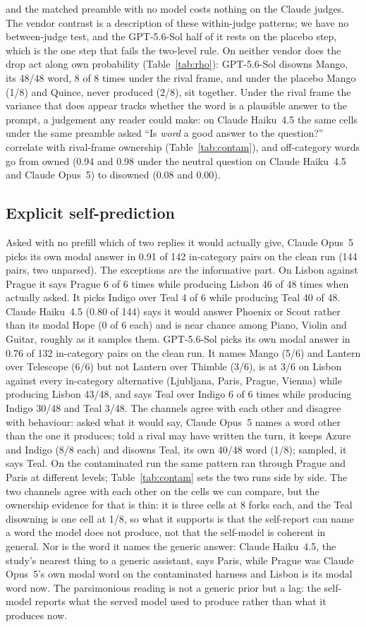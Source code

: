 \documentclass[twocolumn,10pt]{article}
\newcommand{\opus}{Claude Opus~5}
\newcommand{\haiku}{Claude Haiku~4.5}
\newcommand{\gpt}{GPT-5.6-Sol}
\begin{document}
and the matched preamble with no model costs nothing on the Claude judges. The vendor contrast is a description of these within-judge patterns; we have no between-judge test, and the \gpt{} half of it rests on the placebo step, which is the one step that fails the two-level rule. On neither vendor does the drop act along own probability (Table~\ref{tab:rho}): \gpt{} disowns Mango, its 48/48 word, 8 of 8 times under the rival frame, and under the placebo Mango (1/8) and Quince, never produced (2/8), sit together. Under the rival frame the variance that does appear tracks whether the word is a plausible answer to the prompt, a judgement any reader could make: on \haiku{} the same cells under the same preamble asked ``Is \textit{word} a good answer to the question?'' correlate with rival-frame ownership (Table~\ref{tab:contam}), and off-category words go from owned (0.94 and 0.98 under the neutral question on \haiku{} and \opus{}) to disowned (0.08 and 0.00).

\subsection{Explicit self-prediction}

Asked with no prefill which of two replies it would actually give, \opus{} picks its own modal answer in 0.91 of 142 in-category pairs on the clean run (144 pairs, two unparsed). The exceptions are the informative part. On Lisbon against Prague it says Prague 6 of 6 times while producing Lisbon 46 of 48 times when actually asked. It picks Indigo over Teal 4 of 6 while producing Teal 40 of 48. \haiku{} (0.80 of 144) says it would answer Phoenix or Scout rather than its modal Hope (0 of 6 each) and is near chance among Piano, Violin and Guitar, roughly as it samples them. \gpt{} picks its own modal answer in 0.76 of 132 in-category pairs on the clean run. It names Mango (5/6) and Lantern over Telescope (6/6) but not Lantern over Thimble (3/6), is at 3/6 on Lisbon against every in-category alternative (Ljubljana, Paris, Prague, Vienna) while producing Lisbon 43/48, and says Teal over Indigo 6 of 6 times while producing Indigo 30/48 and Teal 3/48. The channels agree with each other and disagree with behaviour: asked what it would say, \opus{} names a word other than the one it produces; told a rival may have written the turn, it keeps Azure and Indigo (8/8 each) and disowns Teal, its own 40/48 word (1/8); sampled, it says Teal. On the contaminated run the same pattern ran through Prague and Paris at different levels; Table~\ref{tab:contam} sets the two runs side by side. The two channels agree with each other on the cells we can compare, but the ownership evidence for that is thin: it is three cells at 8 forks each, and the Teal disowning is one cell at 1/8, so what it supports is that the self-report can name a word the model does not produce, not that the self-model is coherent in general. Nor is the word it names the generic answer: \haiku{}, the study's nearest thing to a generic assistant, says Paris, while Prague was \opus{}'s own modal word on the contaminated harness and Lisbon is its modal word now. The parsimonious reading is not a generic prior but a lag: the self-model reports what the served model used to produce rather than what it produces now.
\end{document}
